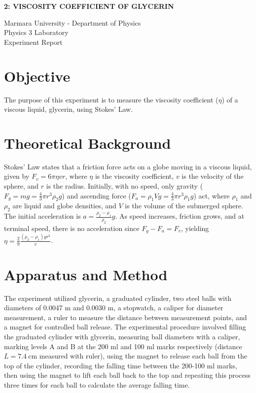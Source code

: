 \documentclass[12pt, a4paper]{article}
\begin{document}
\begin{center}
	\Large \textbf{2: VISCOSITY COEFFICIENT OF GLYCERIN}
	\vspace{0.5cm}
	    
	\normalsize Marmara University - Department of Physics \\
	Physics 3 Laboratory \\
	Experiment Report
	\vspace{0.5cm}
\end{center}

\section{Objective}
The purpose of this experiment is to measure the viscosity coefficient ($\eta$) of a viscous liquid, glycerin, using Stokes' Law.

\section{Theoretical Background}
Stokes' Law states that a friction force acts on a globe moving in a viscous liquid, given by $F_v = 6\pi\eta vr$, where $\eta$ is the viscosity coefficient, $v$ is the velocity of the sphere, and $r$ is the radius. Initially, with no speed, only gravity ($F_g = mg = \frac{4}{3}\pi r^3 \rho_2 g$) and ascending force ($F_a = \rho_1 V g = \frac{4}{3}\pi r^3 \rho_1 g$) act, where $\rho_1$ and $\rho_2$ are liquid and globe densities, and $V$ is the volume of the submerged sphere. The initial acceleration is $a = \frac{\rho_2 - \rho_1}{\rho_2}g$. As speed increases, friction grows, and at terminal speed, there is no acceleration since $F_g - F_a = F_v$, yielding $\eta = \frac{2}{9} \frac{(\rho_2 - \rho_1)g r^2}{v}$.

\section{Apparatus and Method}
The experiment utilized glycerin, a graduated cylinder, two steel balls with diameters of 0.0047 m and 0.0030 m, a stopwatch, a caliper for diameter measurement, a ruler to measure the distance between measurement points, and a magnet for controlled ball release. The experimental procedure involved filling the graduated cylinder with glycerin, measuring ball diameters with a caliper, marking levels A and B at the 200 ml and 100 ml marks respectively (distance $L = \SI{7.4}{\centi\metre}$ measured with ruler), using the magnet to release each ball from the top of the cylinder, recording the falling time between the 200-100 ml marks, then using the magnet to lift each ball back to the top and repeating this process three times for each ball to calculate the average falling time.
\end{document}
